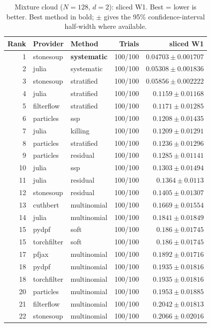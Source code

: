 \begin{table}[!htbp]
\centering
\small
\caption{Mixture cloud ($N=128$, $d=2$): sliced W1. Best = lower is better. Best method in bold; $\pm$ gives the 95\% confidence-interval half-width where available.}
\label{tab:mixture-cloud-sliced-w1}
\begin{tabular}{rllrr}
\toprule
Rank & Provider & Method & Trials & sliced W1 \\
\midrule
1 & stonesoup & \textbf{systematic} & 100/100 & $\mathbf{0.04703 \pm 0.001707}$ \\
2 & julia & systematic & 100/100 & $0.05308 \pm 0.001836$ \\
3 & stonesoup & stratified & 100/100 & $0.05856 \pm 0.002222$ \\
4 & julia & stratified & 100/100 & $0.1159 \pm 0.01168$ \\
5 & filterflow & stratified & 100/100 & $0.1171 \pm 0.01285$ \\
6 & particles & ssp & 100/100 & $0.1208 \pm 0.01435$ \\
7 & julia & killing & 100/100 & $0.1209 \pm 0.01291$ \\
8 & particles & stratified & 100/100 & $0.1236 \pm 0.01296$ \\
9 & particles & residual & 100/100 & $0.1285 \pm 0.01141$ \\
10 & julia & ssp & 100/100 & $0.1303 \pm 0.01494$ \\
11 & julia & residual & 100/100 & $0.1364 \pm 0.0113$ \\
12 & stonesoup & residual & 100/100 & $0.1405 \pm 0.01307$ \\
13 & cuthbert & multinomial & 100/100 & $0.1669 \pm 0.01554$ \\
14 & julia & multinomial & 100/100 & $0.1841 \pm 0.01849$ \\
15 & pydpf & soft & 100/100 & $0.186 \pm 0.01745$ \\
15 & torchfilter & soft & 100/100 & $0.186 \pm 0.01745$ \\
17 & pfjax & multinomial & 100/100 & $0.1892 \pm 0.01716$ \\
18 & pydpf & multinomial & 100/100 & $0.1935 \pm 0.01816$ \\
18 & torchfilter & multinomial & 100/100 & $0.1935 \pm 0.01816$ \\
20 & particles & multinomial & 100/100 & $0.1953 \pm 0.01885$ \\
21 & filterflow & multinomial & 100/100 & $0.2042 \pm 0.01813$ \\
22 & stonesoup & multinomial & 100/100 & $0.2066 \pm 0.02016$ \\

\end{tabular}
\end{table}
